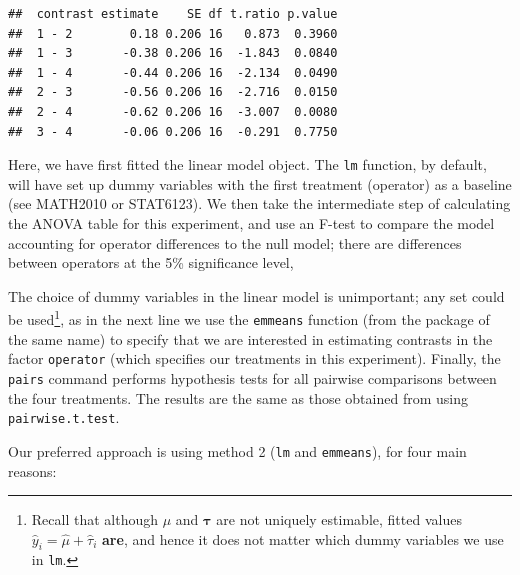 \documentclass[
]{book}
\theoremstyle{definition}
\theoremstyle{definition}
\theoremstyle{definition}
\theoremstyle{definition}
\theoremstyle{remark}
\begin{document}
\begin{enumerate}
\begin{verbatim}
##  contrast estimate    SE df t.ratio p.value
##  1 - 2        0.18 0.206 16   0.873  0.3960
##  1 - 3       -0.38 0.206 16  -1.843  0.0840
##  1 - 4       -0.44 0.206 16  -2.134  0.0490
##  2 - 3       -0.56 0.206 16  -2.716  0.0150
##  2 - 4       -0.62 0.206 16  -3.007  0.0080
##  3 - 4       -0.06 0.206 16  -0.291  0.7750
\end{verbatim}

  Here, we have first fitted the linear model object. The \texttt{lm} function, by default, will have set up dummy variables with the first treatment (operator) as a baseline (see MATH2010 or STAT6123). We then take the intermediate step of calculating the ANOVA table for this experiment, and use an F-test to compare the model accounting for operator differences to the null model; there are differences between operators at the 5\% significance level,

  The choice of dummy variables in the linear model is unimportant; any set could be used\footnote{Recall that although \(\mu\) and \(\boldsymbol{\tau}\) are not uniquely estimable, fitted values \(\hat{y}_i = \hat{\mu} + \hat{\tau}_i\) \textbf{are}, and hence it does not matter which dummy variables we use in \texttt{lm}.}, as in the next line we use the \texttt{emmeans} function (from the package of the same name) to specify that we are interested in estimating contrasts in the factor \texttt{operator} (which specifies our treatments in this experiment). Finally, the \texttt{pairs} command performs hypothesis tests for all pairwise comparisons between the four treatments. The results are the same as those obtained from using \texttt{pairwise.t.test}.
\end{enumerate}

Our preferred approach is using method 2 (\texttt{lm} and \texttt{emmeans}), for four main reasons:
\end{document}
